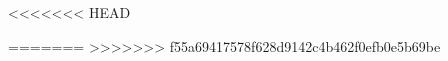 
\usepackage[ngerman]{babel}
\usepackage[utf8]{inputenc}
\usepackage[T1]{fontenc}
\usepackage{microtype}
\usepackage{amsmath}
\usepackage{eurosym}
\usepackage[pdftex]{graphicx}
\usepackage{fancyhdr}
\usepackage{blindtext}
\usepackage{geometry}
<<<<<<< HEAD
\usepackage{todonotes}
=======
>>>>>>> f55a69417578f628d9142c4b462f0efb0e5b69be
\usepackage{url}

\graphicspath{{./media/}{./}}

\geometry{inner=20mm, outer=15mm, top=15mm, bottom=25mm, heightrounded, marginparwidth=37mm, marginparsep=5mm}

\pagestyle{fancy}
\fancyhf{}
\fancyhead[LE]{\leftmark}
\fancyhead[RO]{\rightmark}
\fancyfoot[RO,LE]{\thepage}
